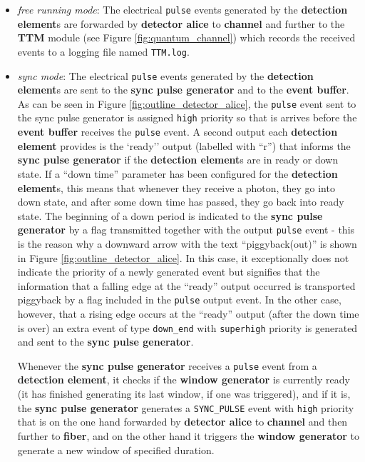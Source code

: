 \begin{itemize}

\item \textit{free running mode}: The electrical \texttt{pulse} events generated by the \textbf{detection element}s are forwarded by \textbf{detector alice} to \textbf{channel} and further to the \textbf{TTM} module (see Figure \ref{fig:quantum_channel}) which records the received events to a logging file named \texttt{TTM.log}.

\item \textit{sync mode}: The electrical \texttt{pulse} events generated by the \textbf{detection element}s are sent to the \textbf{sync pulse generator} and to the \textbf{event buffer}. As can be seen in Figure \ref{fig:outline_detector_alice}, the \texttt{pulse} event sent to the sync pulse generator is assigned \texttt{high} priority so that is arrives before the \textbf{event buffer} receives the \texttt{pulse} event. A second output each \textbf{detection element} provides is the `ready'' output (labelled with ``r'') that informs the \textbf{sync pulse generator} if the \textbf{detection element}s are in ready or down state. If a ``down time'' parameter has been configured for the \textbf{detection element}s, this means that whenever they receive a photon, they go into down state, and after some down time has passed, they go back into ready state. 
The beginning of a down period is indicated to the \textbf{sync pulse generator} by a flag transmitted together with the output \texttt{pulse} event - this is the reason why a downward arrow with the text ``piggyback(out)'' is shown in Figure \ref{fig:outline_detector_alice}. In this case, it exceptionally does not indicate the priority of a newly generated event but signifies that the information that a falling edge at the ``ready'' output occurred is transported piggyback by a flag included in the \texttt{pulse} output event. In the other case, however, that a rising edge occurs at the ``ready'' output (after the down time is over) an extra event of type \texttt{down\_end} with \texttt{superhigh} priority is generated and sent to the \textbf{sync pulse generator}.

Whenever the \textbf{sync pulse generator} receives a \texttt{pulse} event from a \textbf{detection element}, it checks if the \textbf{window generator} is currently ready (it has finished generating its last window, if one was triggered), and if it is, the \textbf{sync pulse generator} generates a \texttt{SYNC\_PULSE} event with \texttt{high} priority that is on the one hand forwarded by \textbf{detector alice} to \textbf{channel} and then further to \textbf{fiber}, and on the other hand it triggers the \textbf{window generator} to generate a new window of specified duration.


\end{itemize}
